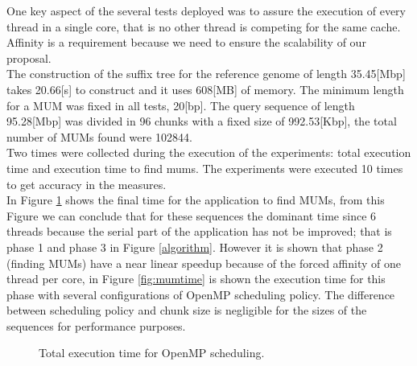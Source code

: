 \documentclass[3p,times]{elsarticle}
\begin{document}
One key aspect of the several tests deployed was to assure the execution of every thread in a single core, that is no other thread is competing for the same cache. Affinity is a requirement because we need to ensure the scalability of our proposal.\\
The construction of the suffix tree for the reference genome of length 35.45[Mbp] takes 20.66[s] to construct and it uses 608[MB] of memory. The minimum length for a MUM was fixed in all tests, 20[bp]. The query sequence of length 95.28[Mbp] was divided in 96 chunks with a fixed size of 992.53[Kbp], the total number of MUMs found were 102844.\\
Two times were collected during the execution of the experiments: total execution time and execution time to find mums. The experiments were executed 10 times to get accuracy in the measures.\\
In Figure \ref{fig:finaltime} shows the final time for the application to find MUMs, from this Figure we can conclude that for these sequences the dominant time since 6 threads because the serial part of the application has not be improved; that is phase 1 and phase 3 in Figure \ref{algorithm}. However it is shown that phase 2 (finding MUMs) have a near linear speedup because of the forced affinity of one thread per core, in Figure \ref{fig:mumtime} is shown the execution time for this phase with several configurations of OpenMP scheduling policy. The difference between scheduling policy and chunk size is negligible for the sizes of the sequences for performance purposes.\\
\begin{figure}
  \centering
  \caption{Total execution time for OpenMP scheduling.}
  \label{fig:finaltime}
\end{figure}
\end{document}
